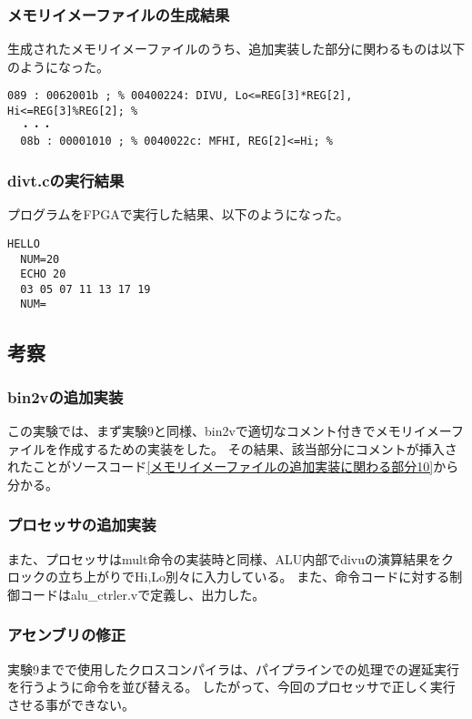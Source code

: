 \subsubsection{メモリイメーファイルの生成結果}
生成されたメモリイメーファイルのうち、追加実装した部分に関わるものは以下のようになった。
\begin{lstlisting}[caption={メモリイメーファイルの追加実装に関わる部分},label={メモリイメーファイルの追加実装に関わる部分10}]
  089 : 0062001b ; % 00400224: DIVU, Lo<=REG[3]*REG[2], Hi<=REG[3]%REG[2]; %
  ・・・
  08b : 00001010 ; % 0040022c: MFHI, REG[2]<=Hi; %
\end{lstlisting}

\subsubsection{divt.cの実行結果}
プログラムをFPGAで実行した結果、以下のようになった。
\begin{lstlisting}[caption={sosuu.cの実行結果},label={sosuu.cの実行結果10}]
  HELLO
  NUM=20
  ECHO 20
  03 05 07 11 13 17 19
  NUM=
\end{lstlisting}

\subsection{考察}
\subsubsection{bin2vの追加実装}
この実験では、まず実験9と同様、bin2vで適切なコメント付きでメモリイメーファイルを作成するための実装をした。
その結果、該当部分にコメントが挿入されたことがソースコード\ref{メモリイメーファイルの追加実装に関わる部分10}から分かる。

\subsubsection{プロセッサの追加実装}
また、プロセッサはmult命令の実装時と同様、ALU内部でdivuの演算結果をクロックの立ち上がりでHi,Lo別々に入力している。
また、命令コードに対する制御コードはalu\_ctrler.vで定義し、出力した。

\subsubsection{アセンブリの修正}
実験9までで使用したクロスコンパイラは、パイプラインでの処理での遅延実行を行うように命令を並び替える。
したがって、今回のプロセッサで正しく実行させる事ができない。

